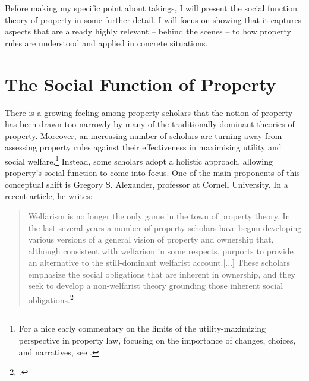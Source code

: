 Before making my specific point about takings, I will present the social function theory of property in some further detail. I will focus on showing that it captures aspects that are already highly relevant -- behind the scenes -- to how property rules are understood and applied in concrete situations.

\section{The Social Function of Property}\label{sec:socfunc}

There is a growing feeling among property scholars that the notion of property has been drawn too narrowly by many of the traditionally dominant theories of property.  Moreover, an increasing number of scholars are turning away from assessing property rules against their effectiveness in maximising utility and social welfare.\footnote{For a nice early commentary on the limits of the utility-maximizing perspective in property law, focusing on the importance of changes, choices, and narratives, see \cite{rose90}.} Instead, some scholars adopt a holistic approach, allowing property's social function to come into focus. One of the main proponents of this conceptual shift is Gregory S. Alexander, professor at Cornell University. In a recent article, he writes:

\begin{quote} Welfarism is no longer the only game in the town of property theory. In the last several years a number of property scholars have begun developing various versions of a general vision of property and ownership that, although consistent with welfarism in some respects, purports to provide an alternative to the still-dominant welfarist account.[...] These scholars emphasize the social obligations that are inherent in ownership, and they seek to develop a non-welfarist theory grounding those inherent social obligations.\footcite[1017]{alexander11}
\end{quote}

